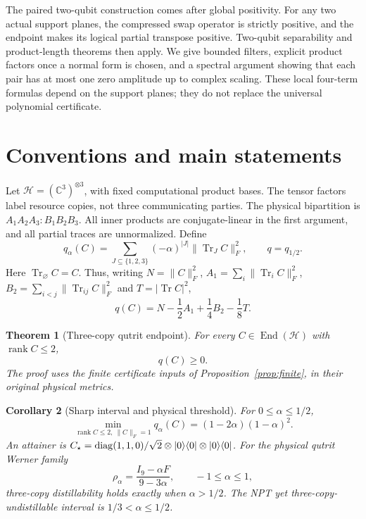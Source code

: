 \documentclass[11pt,a4paper]{article}
\newtheorem{theorem}{Theorem}
\newtheorem{corollary}[theorem]{Corollary}
\theoremstyle{definition}\newtheorem{definition}[theorem]{Definition}
\theoremstyle{remark}\newtheorem{remark}[theorem]{Remark}
\DeclareMathOperator{\Tr}{Tr}\DeclareMathOperator{\rank}{rank}
\newcommand{\C}{\mathbb C}\newcommand{\R}{\mathbb R}
\newcommand{\HH}{\mathcal H}\newcommand{\LL}{\mathcal L}
\newcommand{\nf}[1]{\lVert#1\rVert_F}
\newcommand{\ket}[1]{|#1\rangle}\newcommand{\bra}[1]{\langle#1|}
\numberwithin{equation}{section}
\begin{document}
The paired two-qubit construction comes after global positivity.
For any two actual support planes, the compressed swap operator is
strictly positive, and the endpoint makes its logical partial transpose
positive. Two-qubit separability and product-length theorems
\cite{peres,hhh96,sanpera,wootters} then apply. We give bounded filters,
explicit product factors once a normal form is chosen, and a spectral
argument showing that each pair has at most one zero amplitude up to
complex scaling. These local four-term formulas depend on the support
planes; they do not replace the universal polynomial certificate.

\section{Conventions and main statements}\label{sec:statements}
Let $\HH=(\C^3)^{\otimes3}$, with fixed computational product bases.
The tensor factors label resource copies, not three communicating
parties. The physical bipartition is
$A_1A_2A_3:B_1B_2B_3$.
All inner products are conjugate-linear in the first argument, and
all partial traces are unnormalized. Define
\begin{equation}
q_\alpha(C)=\sum_{J\subseteq\{1,2,3\}}(-\alpha)^{|J|}
                   \nf{\Tr_JC}^2,\qquad q=q_{1/2}.
\label{eq:qalpha}
\end{equation}
Here $\Tr_\varnothing C=C$. Thus, writing
$N=\nf C^2$, $A_1=\sum_i\nf{\Tr_iC}^2$,
$B_2=\sum_{i<j}\nf{\Tr_{ij}C}^2$ and $T=|\Tr C|^2$,
\begin{equation}
q(C)=N-\frac12A_1+\frac14B_2-\frac18T.
\label{eq:q}
\end{equation}

\begin{theorem}[Three-copy qutrit endpoint]\label{thm:endpoint}
For every $C\in\operatorname{End}(\HH)$ with $\rank C\le2$,
\begin{equation}
q(C)\ge0.
\label{eq:endpoint}
\end{equation}
The proof uses the finite certificate inputs of
Proposition~\ref{prop:finite}, in their original physical metrics.
\end{theorem}

\begin{corollary}[Sharp interval and physical threshold]\label{cor:interval}
For $0\le\alpha\le1/2$,
\begin{equation}
\min_{\rank C\le2,\ \nf C=1}q_\alpha(C)
=(1-2\alpha)(1-\alpha)^2.
\label{eq:minimum}
\end{equation}
An attainer is
$C_\star=\diag(1,1,0)/\sqrt2\otimes\ket0\bra0\otimes\ket0\bra0$.
For the physical qutrit Werner family
\begin{equation}
\rho_\alpha=\frac{I_9-\alpha F}{9-3\alpha},\qquad -1\le\alpha\le1,
\label{eq:werner}
\end{equation}
three-copy distillability holds exactly when $\alpha>1/2$.
The NPT yet three-copy-undistillable interval is $1/3<\alpha\le1/2$.
\end{corollary}
\end{document}

